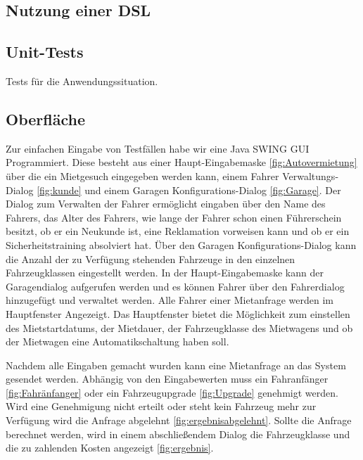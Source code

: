 \subsection{Nutzung einer DSL}

\subsection{Unit-Tests}
Tests für die Anwendungssituation.

\subsection{Oberfläche}
Zur einfachen Eingabe von Testfällen habe wir eine Java SWING GUI Programmiert. Diese besteht aus einer Haupt-Eingabemaske \ref{fig:Autovermietung} über die ein Mietgesuch eingegeben werden kann, einem Fahrer Verwaltungs-Dialog \ref{fig:kunde} und einem Garagen Konfigurations-Dialog \ref{fig:Garage}. Der Dialog zum Verwalten der Fahrer ermöglicht eingaben über den Name des Fahrers, das Alter des Fahrers, wie lange der Fahrer schon einen Führerschein besitzt, ob er ein Neukunde ist, eine Reklamation vorweisen kann und ob er ein Sicherheitstraining absolviert hat. Über den Garagen Konfigurations-Dialog kann die Anzahl der zu Verfügung stehenden Fahrzeuge in den einzelnen Fahrzeugklassen eingestellt werden. In der Haupt-Eingabemaske kann der Garagendialog aufgerufen werden und es können Fahrer über den Fahrerdialog hinzugefügt und verwaltet werden. Alle Fahrer einer Mietanfrage werden im Hauptfenster Angezeigt. Das Hauptfenster bietet die Möglichkeit zum einstellen des Mietstartdatums, der Mietdauer, der Fahrzeugklasse des Mietwagens und ob der Mietwagen eine Automatikschaltung haben soll. 

Nachdem alle Eingaben gemacht wurden kann eine Mietanfrage an das System gesendet werden. Abhängig von den Eingabewerten muss ein Fahranfänger \ref{fig:Fahränfanger} oder ein Fahrzeugupgrade \ref{fig:Upgrade} genehmigt werden. Wird eine Genehmigung nicht erteilt oder steht kein Fahrzeug mehr zur Verfügung wird die Anfrage abgelehnt \ref{fig:ergebnisabgelehnt}. Sollte die Anfrage berechnet werden, wird in einem abschließendem Dialog die Fahrzeugklasse und die zu zahlenden Kosten angezeigt \ref{fig:ergebnis}.


